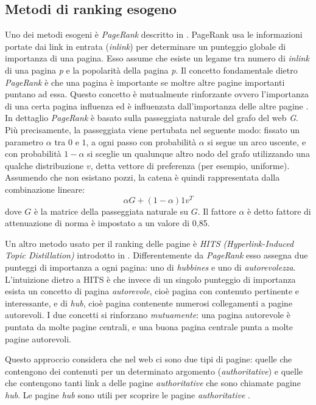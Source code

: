 \subsection{Metodi di ranking esogeno}
Uno dei metodi esogeni è \textit{PageRank} descritto in \cite{ilprints422}. PageRank usa le informazioni portate dai link in entrata (\textit{inlink}) per determinare un punteggio globale di importanza di una pagina. Esso assume che esiste un legame tra numero di \textit{inlink} di una pagina \textit{p} e la popolarità della pagina \textit{p}. Il concetto fondamentale dietro \textit{PageRank} è che una pagina è importante se moltre altre pagine importanti puntano ad essa. Questo concetto è mutualmente rinforzante ovvero l'importanza di una certa pagina influenza ed è influenzata dall'importanza delle altre pagine \cite{ilprints646}. In dettaglio \textit{PageRank} è basato sulla passeggiata naturale del grafo del web \textit{G}. Più precisamente, la passeggiata viene pertubata nel seguente modo: fissato un parametro \(\alpha\) tra \(0\) e \(1\), a ogni passo con probabilità \(\alpha\) si segue un arco uscente, e con probabilità \(1- \alpha \) si sceglie un qualunque altro nodo del grafo utilizzando una 
qualche 
distribuzione \(v\), detta
vettore di preferenza (per esempio, uniforme). Assumendo che non esistano pozzi, la catena è quindi rappresentata dalla combinazione lineare:
\begin{equation}
 \alpha G + (1 - \alpha) 1 v^T
\end{equation}
dove \(G\) è la matrice della passeggiata naturale su \(G\). Il fattore \(\alpha\) è detto fattore di attenuazione di norma è impostato a un valore di 0,85.

Un altro metodo usato per il ranking delle pagine è \textit{HITS (Hyperlink-Induced Topic Distillation)} introdotto in \cite{Kleinberg:1999:ASH:324133.324140}. Differentemente da \textit{PageRank} esso assegna due punteggi di importanza a ogni pagina: uno di \textit{hubbines} e uno di \textit{autorevolezza}. L’intuizione dietro a HITS è che invece di un singolo punteggio di importanza esista un concetto di pagina \textit{autorevole}, cioè pagina con contenuto pertinente e interessante, e di \textit{hub}, cioè pagina contenente numerosi collegamenti a pagine autorevoli. I due concetti si rinforzano \textit{mutuamente}: una pagina autorevole è puntata da molte pagine centrali, e una buona pagina centrale punta a molte pagine autorevoli.

Questo approccio considera che nel web ci sono due tipi di pagine: quelle che contengono dei contenuti per un determinato argomento (\textit{authoritative}) e quelle che contengono tanti link a delle pagine \textit{authoritative} che sono chiamate pagine \textit{hub}. Le pagine \textit{hub} sono utili per scoprire le pagine \textit{authoritative} \cite{Manning:2008:IIR:1394399p474}.

